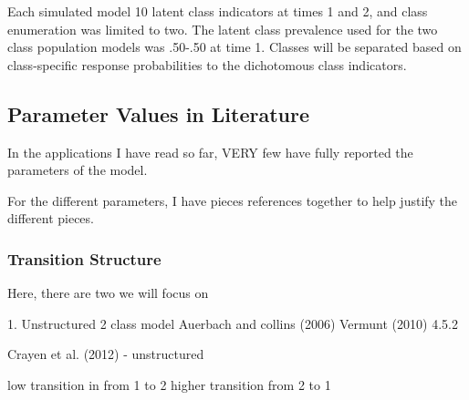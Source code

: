 \documentclass[man, noextraspace, floatsintext, 12pt]{apa7}
\begin{document}
Each simulated model 10 latent class indicators at times 1 and 2, and class enumeration was limited to two. The latent class prevalence used for the two class population models was .50-.50 at time 1. Classes will be separated based on class-specific response probabilities to the dichotomous class indicators. 


\subsection{Parameter Values in Literature}

In the applications I have read so far, VERY few have fully reported the parameters of the model.

For the different parameters, I have pieces references together to help justify the different pieces.

 
\subsubsection{Transition Structure}

Here, there are two we will focus on

1. Unstructured 2 class model
Auerbach and collins (2006)
Vermunt (2010) 4.5.2

Crayen et al. (2012) - unstructured

\citep{Asparouhov2008}
low transition in from 1 to 2
higher transition from 2 to 1
\end{document}
